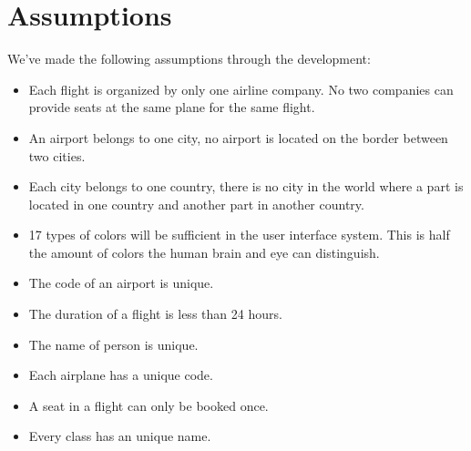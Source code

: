 
\section{Assumptions}
We've made the following assumptions through the development:
\begin{itemize}
 \item Each flight is organized by only one airline company. No two companies
can provide seats at the same plane for the same flight.
 \item An airport belongs to one city, no airport is located on the border
between two cities.
 \item Each city belongs to one country, there is no city in the world where a
part is located in one country and another part in another country.
 \item 17 types of colors will be sufficient in the user interface system. This is half
the amount of colors the human brain and eye can distinguish.
\item The code of an airport is unique.
\item The duration of a flight is less than 24 hours.
\item The name of person is unique.
\item Each airplane has a unique code.
\item A seat in a flight can only be booked once.
\item Every class has an unique name.
\end{itemize}